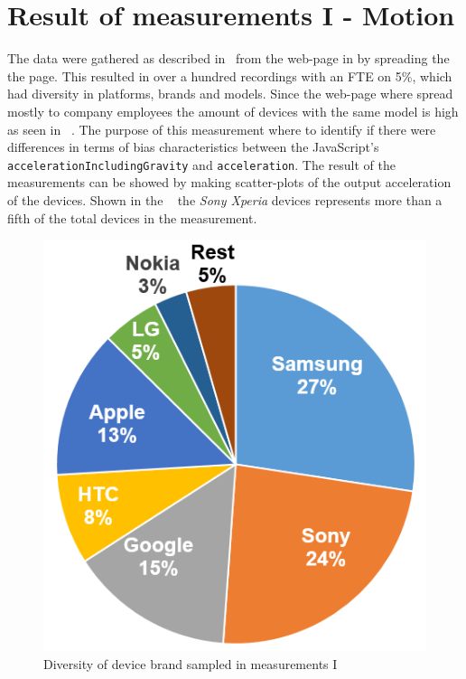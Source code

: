 \section{Result of measurements I  - Motion}\label{res:testI}
The data were gathered as described in~ from the web-page in  by spreading the the page. This resulted in over a hundred recordings with an FTE on 5\%, which had diversity in platforms, brands and models. Since the web-page where spread mostly to company employees the amount of devices with the same model is high as seen in ~.
The purpose of this measurement where to identify if there were differences in terms of bias characteristics between the JavaScript's \texttt{accelerationIncludingGravity} and \texttt{acceleration}. The result of the measurements can be showed by making scatter-plots of the output acceleration of the devices. Shown in the ~ the \textit{Sony Xperia} devices represents more than a fifth of the total devices in the measurement. 
\begin{figure}[ht]
	\centering
	\includegraphics[scale=0.3]{img/measure1-brand}
	\caption{Diversity of device brand sampled in measurements I}
	\label{fig:measure1-brand}
\end{figure}
